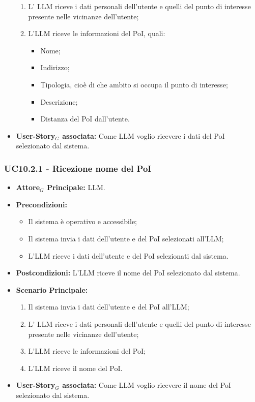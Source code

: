 \documentclass[11pt]{article}
\begin{document}
\begin{justify}
\begin{itemize}
\begin{enumerate}
          \item L' LLM riceve i dati personali dell'utente e quelli del punto di interesse presente nelle vicinanze dell'utente;
          \item L'LLM riceve le informazioni del PoI, quali:
          \begin{itemize}
          \item Nome;
          \item Indirizzo;
          \item Tipologia, cioè di che ambito si occupa il punto di interesse;
          \item Descrizione;
          \item Distanza del PoI dall'utente.
          \end{itemize}
        \end{enumerate}
      \item \textbf{User-Story$_G$ associata:} Come LLM voglio ricevere i dati del PoI selezionato dal sistema.
\end{itemize}
\subsubsection{\textbf{UC10.2.1 - Ricezione nome del PoI}}
\begin{itemize}
    \item \textbf{Attore$_G$ Principale:} LLM.
    \item \textbf{Precondizioni:} 
        \begin{itemize}
          \item Il sistema è operativo e accessibile;
          \item Il sistema invia i dati dell'utente e del PoI selezionati all'LLM;
            \item L'LLM riceve i dati dell'utente e del PoI selezionati dal sistema.
        \end{itemize}
      \item \textbf{Postcondizioni:} L'LLM riceve il nome del PoI selezionato dal sistema.
    \item \textbf{Scenario Principale:} 
        \begin{enumerate}
          \item Il sistema invia i dati dell'utente e del PoI all'LLM;
        \item L' LLM riceve i dati personali dell'utente e quelli del punto di interesse presente nelle vicinanze dell'utente;
          \item L'LLM riceve le informazioni del PoI;
          \item L'LLM riceve il nome del PoI.
        \end{enumerate}
      \item \textbf{User-Story$_G$ associata:} Come LLM voglio ricevere il nome del PoI selezionato dal sistema.
\end{itemize}

\end{justify}
\end{document}
